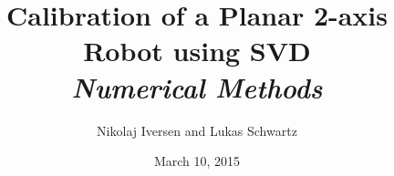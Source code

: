 \documentclass[12pt,a4paper]{article}
\begin{document}
\title{Calibration of a Planar 2-axis Robot using SVD\\{\large\emph{Numerical Methods}}}
\author{Nikolaj Iversen and Lukas Schwartz}
\date{March 10, 2015}
\maketitle

\newpage

\tableofcontents
\listoffigures
\listoftables

\newpage









\end{document}
